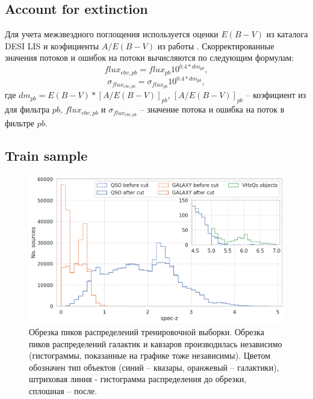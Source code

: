 \documentclass[fleqn,usenatbib]{mnras}
\begin{document}
\subsection{Account for extinction}

Для учета межзвездного поглощения используется оценки $E(B-V)$ из каталога DESI LIS и коэфициенты $A/E(B-V)$ из работы \citep{2011ApJ...737..103S}. Скорректированные значения потоков и ошибок на потоки вычисляются по следующим формулам:
\begin{equation}
    flux_{ebv, pb} = flux_{pb} 10^{0.4 * dm_{pb}},
\end{equation}
\begin{equation}
    \sigma_{flux_{ebv, pb}} = \sigma_{flux_{pb}} 10^{0.4 * dm_{pb}},
\end{equation}
где $dm_{pb} = E(B-V) * [A/E(B-V)]_{pb}$, $[A/E(B-V)]_{pb}$ -- коэфициент из \citep{2011ApJ...737..103S} для фильтра $pb$, $flux_{ebv, pb}$ и $\sigma_{flux_{ebv, pb}}$ -- значение потока и ошибка на поток в фильтре $pb$.

\subsection{Train sample}

\begin{figure}
    \centering
    \includegraphics[width=0.95\linewidth]{images/train-peaks-cut.png}
    \caption{Обрезка пиков распределений тренировочной выборки. Обрезка пиков распределений галактик и кавзаров производилась независимо (гистограммы, показанные на графике тоже независимы). Цветом обозначен тип объектов (синий -- квазары, оранжевый -- галактики), штриховая линия - гистограмма распределения до обрезки, сплошная -- после.}
    \label{fig:train-peaks-cut}
\end{figure}
\end{document}
